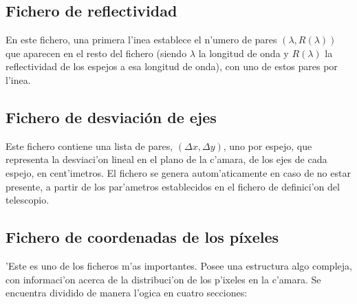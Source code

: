 \subsection{Fichero de reflectividad}

En este fichero, una primera l'inea establece el n'umero de pares $(\lambda,
R(\lambda))$ que aparecen en el resto del fichero (siendo $\lambda$ la
longitud de onda y $R(\lambda)$ la reflectividad de los espejos a esa
longitud de onda), con uno de estos pares por l'inea.

\subsection{Fichero de desviaci\'on de ejes}

Este fichero contiene una lista de pares, $(\Delta x, \Delta y)$, uno
por espejo, que representa la desviaci'on lineal en el plano de la
c'amara, de los ejes de cada espejo, en cent'imetros.  El fichero se
genera autom'aticamente en caso de no estar presente, a partir de los
par'ametros establecidos en el fichero de definici'on del telescopio.

\subsection{Fichero de coordenadas de los p\'ixeles}

'Este es uno de los ficheros m'as importantes.  Posee una estructura
algo compleja, con informaci'on acerca de la distribuci'on de los
p'ixeles en la c'amara.  Se encuentra dividido de manera l'ogica en
cuatro secciones:

